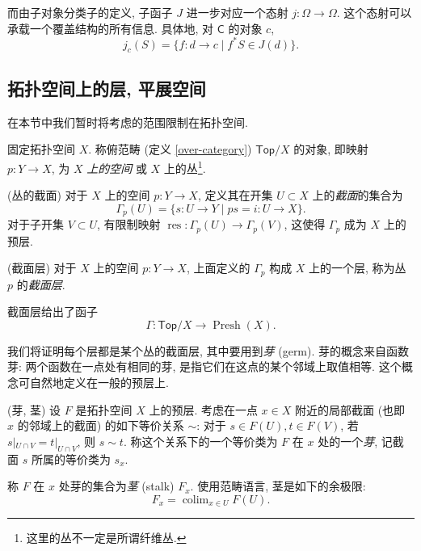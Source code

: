 而由子对象分类子的定义, 子函子 $J$ 进一步对应一个态射 $j\colon \Omega \to \Omega$.
这个态射可以承载一个覆盖结构的所有信息.
具体地, 对 $\mathsf C$ 的对象 $c$,
$$
j_c(S) = \{f\colon d\to c\mid f^*S \in J(d)\}.
$$


\subsection{拓扑空间上的层, 平展空间}

在本节中我们暂时将考虑的范围限制在拓扑空间.

固定拓扑空间 $X$. 称俯范畴 (定义 \ref{over-category}) $\mathsf {Top}/X$ 的对象, 即映射 $p \colon Y \to X$, 为 $X$ \emph{上的空间} 或 $X$ 上的丛\footnote{这里的丛不一定是所谓纤维丛.}.

\begin{definition}
    {(丛的截面)}
    对于 $X$ 上的空间 $p \colon Y\to X$, 定义其在开集 $U\subset X$ 上的\emph{截面}的集合为
    $$
    \Gamma_p(U)=
    \big\{
        s \colon U \to Y \mid ps=i\colon U \to X
    \big\}.
    $$
    对于子开集 $V\subset U$, 有限制映射 $\operatorname{res}\colon \Gamma_p(U) \to \Gamma_p(V)$, 这使得 $\Gamma_p$ 成为 $X$ 上的预层.
\end{definition}

\begin{propdef}
    {(截面层)}
    对于 $X$ 上的空间 $p \colon Y\to X$, 上面定义的 $\Gamma_p$ 构成 $X$ 上的一个层, 称为丛 $p$ 的\emph{截面层}.
    
    截面层给出了函子
    $$\Gamma \colon \mathsf {Top}/X \to \operatorname{Presh}(X).$$
\end{propdef}

我们将证明每个层都是某个丛的截面层, 其中要用到\emph{芽} (germ).
芽的概念来自函数芽: 两个函数在一点处有相同的芽, 是指它们在这点的某个邻域上取值相等. 这个概念可自然地定义在一般的预层上.

\begin{definition}
	[label={germ-and-stalk}]
	{(芽, 茎)}
    设 $F$ 是拓扑空间 $X$ 上的预层. 考虑在一点 $x\in X$ 附近的局部截面 (也即 $x$ 的邻域上的截面) 的如下等价关系 $\sim$: 对于 $s\in F(U),t\in F(V)$, 若 $s|_{U\cap V}=t|_{U\cap V}$, 则 $s\sim t$. 称这个关系下的一个等价类为 $F$ 在 $x$ 处的一个\emph{芽}, 记截面 $s$ 所属的等价类为 $s_x$.
    
    称 $F$ 在 $x$ 处芽的集合为\emph{茎} (stalk) $F_x$.
    使用范畴语言, 茎是如下的余极限:
    $$
    F_x = \operatorname{colim}_{x\in U}F(U).
    $$
\end{definition}

